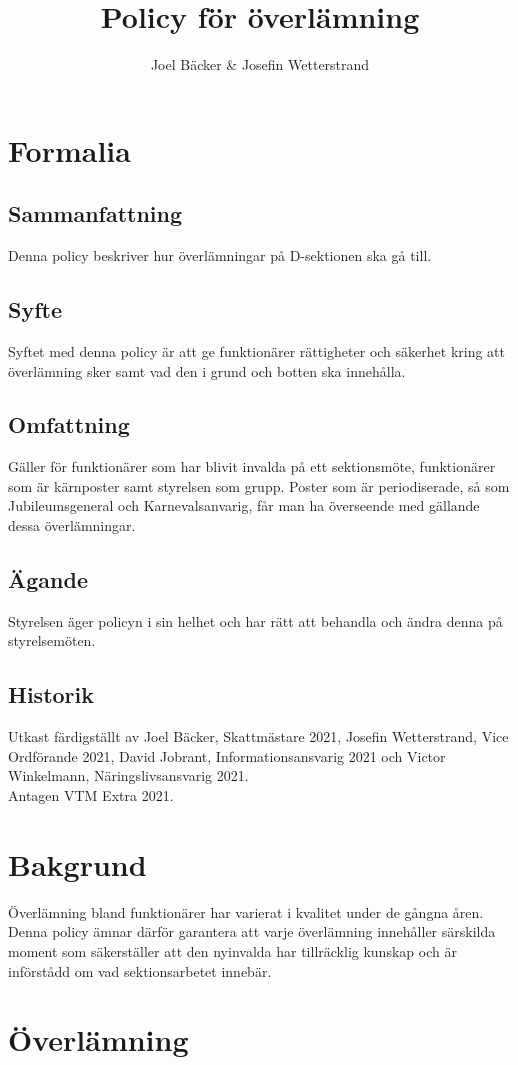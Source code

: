 \documentclass[]{dsekprotokoll}
\title{Policy för överlämning}
\author{Joel Bäcker \& Josefin Wetterstrand}
\begin{document}
\section{Formalia}
\subsection{Sammanfattning}
Denna policy beskriver hur överlämningar på D-sektionen ska gå till.

\subsection{Syfte}
Syftet med denna policy är att ge funktionärer rättigheter och säkerhet kring att överlämning sker samt vad den i grund och botten ska innehålla.

\subsection{Omfattning} %
Gäller för funktionärer som har blivit invalda på ett sektionsmöte, funktionärer som är kärnposter samt styrelsen som grupp. Poster som är periodiserade, så som Jubileumsgeneral och Karnevalsanvarig, får man ha överseende med gällande dessa överlämningar.

\subsection{Ägande}
Styrelsen äger policyn i sin helhet och har rätt att behandla och ändra denna på styrelsemöten.

\subsection{Historik}
Utkast färdigställt av Joel Bäcker, Skattmästare 2021, Josefin Wetterstrand, Vice Ordförande 2021, David Jobrant, Informationsansvarig 2021 och Victor Winkelmann, Näringslivsansvarig 2021.
\\ Antagen VTM Extra 2021. 
\section{Bakgrund}
Överlämning bland funktionärer har varierat i kvalitet under de gångna åren. Denna policy ämnar därför garantera att varje överlämning innehåller särskilda moment som säkerställer att den nyinvalda har tillräcklig kunskap och är införstådd om vad sektionsarbetet innebär.

\section{Överlämning}
\end{document}
